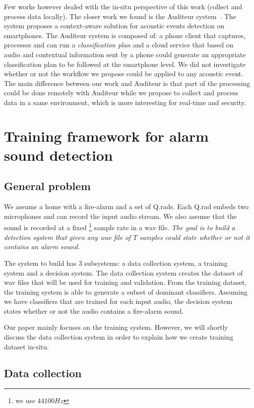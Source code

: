 \documentclass[10pt, conference, compsocconf]{IEEEtran}
\begin{document}
Few works however dealed with the in-situ perspective of this work (collect and process data locally). The closer work we found is the 
Auditeur system~\cite{Nirjon:2013:AMS:2462456.2464446}. The system proposes a context-aware solution for acoustic events detection on smartphones. 
The Auditeur system is composed of: a phone client that captures, processes and can run a {\it classification plan} and a cloud 
service that based on audio and contextual information sent by a phone could generate an appropriate classification plan to be 
followed at the smartphone level. We did not investigate whether or not the workflow we propose could be applied 
to any acoustic event. The main difference between our work and Auditeur is that part of the processing could be done 
remotely with Auditeur while we propose to collect and process 
data in a same environment, which is more interesting for real-time and security.

\section{Training framework for alarm sound detection } \label{Framework}
\subsection{General problem}

We assume a home with a fire-alarm and a set of Q.rads. Each Q.rad embeds two microphones and can record the input audio 
stream. We also assume that the sound is recorded at a fixed \footnote{we use $44100Hz$} sample rate in a wav file. {\it The goal is to build  a detection system that given any wav file of $T$ samples could state whether or not it contains an alarm sound}.

The system to build has $3$ subsystems: a data collection system, a training system and a decision system. 
The data collection system creates the dataset of wav files that will be used for training and validation. 
From the training dataset, the training system is able to generate a subset of dominant classifiers. Assuming we have classifiers that are trained for each input audio, the decision system states whether or not the audio contains a fire-alarm sound.

Our paper mainly focuses on the training system. However, we will shortly discuss the data collection system in order 
to explain how we create training dataset in-situ.

\subsection{Data collection}
\end{document}
